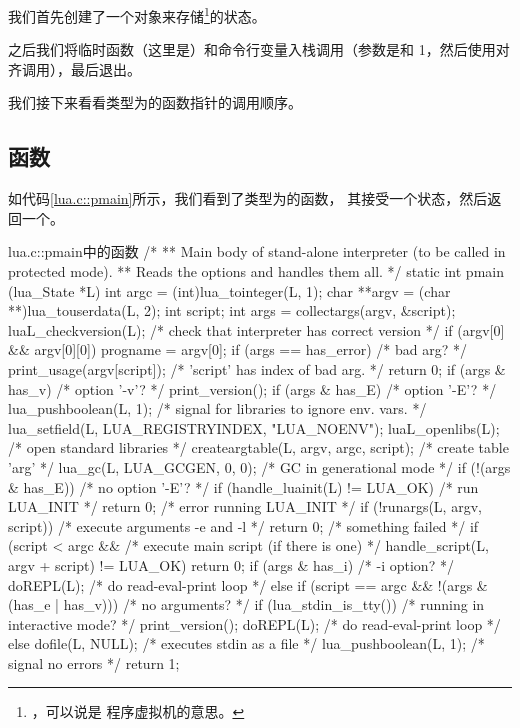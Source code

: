 我们首先创建了一个对象来存储\footnote{，可以说是
程序虚拟机的意思。}的状态。

之后我们将临时函数（这里是）和命令行变量入栈调用（参数是和\cmd
{1}，然后使用对齐调用），最后退出。

我们接下来看看类型为的函数指针的调用顺序。

\subsection{函数}

如代码\ref{lua.c::pmain}所示，我们看到了类型为的函数，
其接受一个状态，然后返回一个。

\begin{ccode}{lua.c::pmain}{中的函数}
/*
** Main body of stand-alone interpreter (to be called in protected mode).
** Reads the options and handles them all.
*/
static int pmain (lua_State *L) {
  int argc = (int)lua_tointeger(L, 1);
  char **argv = (char **)lua_touserdata(L, 2);
  int script;
  int args = collectargs(argv, &script);
  luaL_checkversion(L);  /* check that interpreter has correct version */
  if (argv[0] && argv[0][0]) progname = argv[0];
  if (args == has_error) {  /* bad arg? */
    print_usage(argv[script]);  /* 'script' has index of bad arg. */
    return 0;
  }
  if (args & has_v)  /* option '-v'? */
    print_version();
  if (args & has_E) {  /* option '-E'? */
    lua_pushboolean(L, 1);  /* signal for libraries to ignore env. vars. */
    lua_setfield(L, LUA_REGISTRYINDEX, "LUA_NOENV");
  }
  luaL_openlibs(L);  /* open standard libraries */
  createargtable(L, argv, argc, script);  /* create table 'arg' */
  lua_gc(L, LUA_GCGEN, 0, 0);  /* GC in generational mode */
  if (!(args & has_E)) {  /* no option '-E'? */
    if (handle_luainit(L) != LUA_OK)  /* run LUA_INIT */
      return 0;  /* error running LUA_INIT */
  }
  if (!runargs(L, argv, script))  /* execute arguments -e and -l */
    return 0;  /* something failed */
  if (script < argc &&  /* execute main script (if there is one) */
      handle_script(L, argv + script) != LUA_OK)
    return 0;
  if (args & has_i)  /* -i option? */
    doREPL(L);  /* do read-eval-print loop */
  else if (script == argc && !(args & (has_e | has_v))) {  /* no arguments? */
    if (lua_stdin_is_tty()) {  /* running in interactive mode? */
      print_version();
      doREPL(L);  /* do read-eval-print loop */
    }
    else dofile(L, NULL);  /* executes stdin as a file */
  }
  lua_pushboolean(L, 1);  /* signal no errors */
  return 1;
}
\end{ccode}

